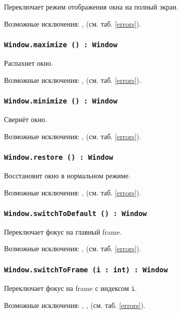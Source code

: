 Переключает режим отображения окна на полный экран.

Возможные исключения: ,  (см. таб. \ref{errors}).

\subsubsection{\texttt{Window.maximize () : Window}}

Распахнет окно.

Возможные исключения: ,  (см. таб. \ref{errors}).

\subsubsection{\texttt{Window.minimize () : Window}}

Свернёт окно.

Возможные исключения: ,  (см. таб. \ref{errors}).

\subsubsection{\texttt{Window.restore () : Window}}

Восстановит окно в нормальном режиме.

Возможные исключения: ,  (см. таб. \ref{errors}).

\subsubsection{\texttt{Window.switchToDefault () : Window}}

Переключает фокус на главный frame.

Возможные исключения: ,  (см. таб. \ref{errors}).

\subsubsection{\texttt{Window.switchToFrame (i : int) : Window}}

Переключает фокус на frame с индексом \texttt{i}.

Возможные исключения: , ,  (см. таб. \ref{errors}).


